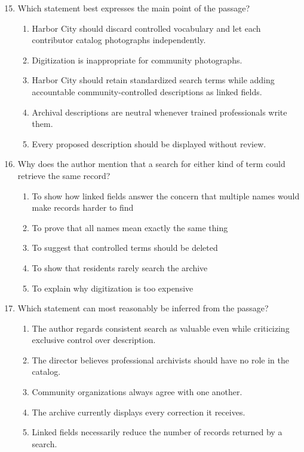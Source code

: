 \begin{enumerate}
\setcounter{enumi}{14}

\item Which statement best expresses the main point of the passage?
\begin{enumerate}
\item[(A)] Harbor City should discard controlled vocabulary and let each contributor catalog photographs independently.
\item[(B)] Digitization is inappropriate for community photographs.
\item[(C)] Harbor City should retain standardized search terms while adding accountable community-controlled descriptions as linked fields.
\item[(D)] Archival descriptions are neutral whenever trained professionals write them.
\item[(E)] Every proposed description should be displayed without review.
\end{enumerate}

\item Why does the author mention that a search for either kind of term could retrieve the same record?
\begin{enumerate}
\item[(A)] To show how linked fields answer the concern that multiple names would make records harder to find
\item[(B)] To prove that all names mean exactly the same thing
\item[(C)] To suggest that controlled terms should be deleted
\item[(D)] To show that residents rarely search the archive
\item[(E)] To explain why digitization is too expensive
\end{enumerate}

\item Which statement can most reasonably be inferred from the passage?
\begin{enumerate}
\item[(A)] The author regards consistent search as valuable even while criticizing exclusive control over description.
\item[(B)] The director believes professional archivists should have no role in the catalog.
\item[(C)] Community organizations always agree with one another.
\item[(D)] The archive currently displays every correction it receives.
\item[(E)] Linked fields necessarily reduce the number of records returned by a search.
\end{enumerate}


\end{enumerate}
